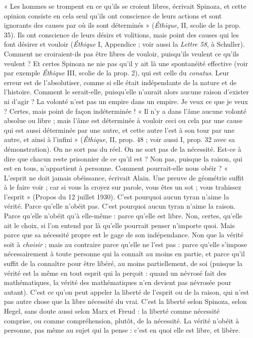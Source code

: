 {« Les hommes se trompent en ce qu’ils se croient libres, écrivait Spinoza, et
cette opinion consiste en cela seul qu’ils ont conscience de leurs actions et sont
ignorants des causes par où ils sont déterminés » ({\it Éthique}, II, scolie de la
prop. 35). Ils ont conscience de leurs désirs et volitions, mais point des causes
qui les font désirer et vouloir ({\it Éthique} I, Appendice ; voir aussi la {\it Lettre 58}, à
Schuller). Comment ne croiraient-ils pas être libres de vouloir, puisqu'ils veulent
ce qu’ils veulent ? Et certes Spinoza ne nie pas qu’il y ait là une spontanéité
effective (voir par exemple {\it Éthique} III, scolie de la prop. 2), qui est celle du
{\it conatus}. Leur erreur est de l’absolutiser, comme si elle était indépendante de la
nature et de l’histoire. Comment le serait-elle, puisqu’elle n’aurait alors aucune
raison d'exister ni d’agir ? La volonté n’est pas un empire dans un empire. Je
veux ce que je veux ? Certes, mais point de façon indéterminée ! « Il n’y a dans
l’âme aucune volonté absolue ou libre ; mais l’âme est déterminée à vouloir ceci
ou cela par une cause qui est aussi déterminée par une autre, et cette autre l’est
à son tour par une autre, et ainsi à l'infini » ({\it Éthique}, II, prop. 48 ; voir aussi I,
prop. 32 avec sa démonstration). On ne sort pas du réel. On ne sort pas de la
nécessité. Est-ce à dire que chacun reste prisonnier de ce qu’il est ? Non pas,
puisque la raison, qui est en tous, n’appartient à personne. Comment pourrait-elle
nous obéir ? « L'esprit ne doit jamais obéissance, écrivait Alain. Une preuve
de géométrie suffit à le faire voir ; car si vous la croyez sur parole, vous êtes un
sot ; vous trahissez l'esprit » (Propos du 12 juillet 1930). C’est pourquoi aucun
tyran n'aime la vérité. Parce qu’elle n’obéit pas. C’est pourquoi aucun tyran
n'aime la raison. Parce qu’elle n’obéit qu’à elle-même : parce qu’elle est libre.
Non, certes, qu’elle ait le choix, si l’on entend par là qu’elle pourrait penser
n'importe quoi. Mais parce que sa nécessité propre est le gage de son indépendance.
Non que la vérité soit à {\it choisir} ; mais au contraire parce qu’elle ne l’est
pas : parce qu’elle s’impose nécessairement à toute personne qui la connaît au
moins en partie, et parce qu'il suffit de la connaître pour être libéré, au moins
partiellement, de soi (puisque la vérité est la même en tout esprit qui la
perçoit : quand un névrosé fait des mathématiques, la vérité des mathématiques
n’en devient pas névrosée pour autant). C’est ce qu’on peut appeler la liberté
de l’esprit ou de la raison, qui n’est pas autre chose que la libre nécessité du
vrai. C’est la liberté selon Spinoza, selon Hegel, sans doute aussi selon Marx et
Freud : la liberté comme nécessité comprise, ou comme compréhension,
plutôt, de la nécessité. La vérité n’obéit à personne, pas même au sujet qui la
pense : c’est en quoi elle est libre, et libère.

}
